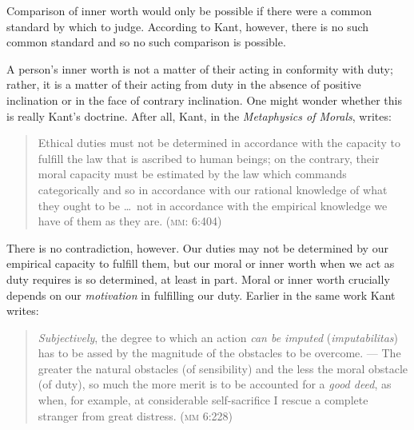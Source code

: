 \documentclass[a4paper,12pt]{article}
\begin{document}
Comparison of inner worth would only be possible if there were a common standard by which to judge. According to Kant, however, there is no such common standard and so no such comparison is possible.

A person's inner worth is not a matter of their acting in conformity with duty; rather, it is a matter of their acting from duty in the absence of positive inclination or in the face of contrary inclination. %
% 	
% 
% 
One might wonder whether this is really Kant's doctrine. After all, Kant, in the \emph{Metaphysics of Morals}, writes:
\begin{quote}
	Ethical duties must not be determined in accordance with the capacity to fulfill the law that is ascribed to human beings; on the contrary, their moral capacity must be estimated by the law which commands categorically and so in accordance with our rational knowledge of what they ought to be \ldots\ not in accordance with the empirical knowledge we have of them as they are. (\textsc{mm}: 6:404)
\end{quote}
There is no contradiction, however. Our duties may not be determined by our empirical capacity to fulfill them, but our moral or inner worth when we act as duty requires is so determined, at least in part. Moral or inner worth crucially depends on our \emph{motivation} in fulfilling our duty. Earlier in the same work Kant writes:
\begin{quote}
	\emph{Subjectively}, the degree to which an action \emph{can be imputed} (\emph{imputabilitas}) has to be assed by the magnitude of the obstacles to be overcome. --- The greater the natural obstacles (of sensibility) and the less the moral obstacle (of duty), so much the more merit is to be accounted for a \emph{good deed}, as when, for example, at considerable self-sacrifice I rescue a complete stranger from great distress. (\textsc{mm} 6:228)
\end{quote}
\end{document}
